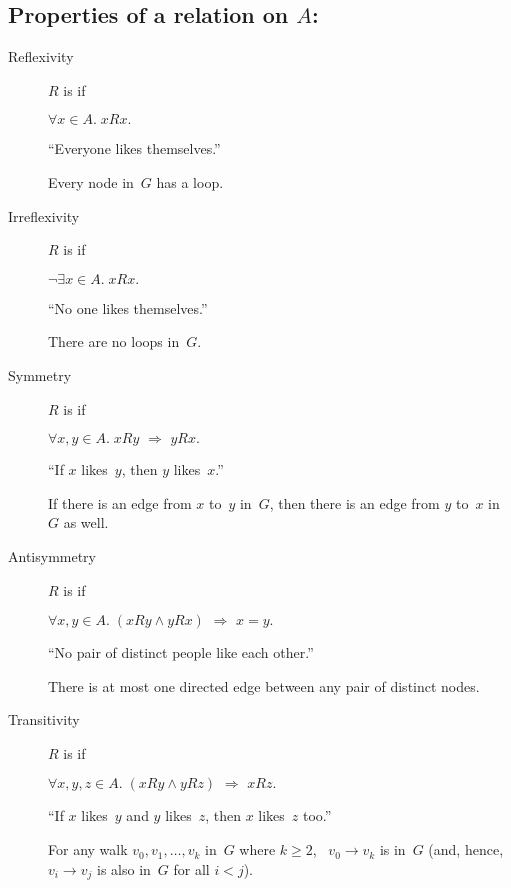 \documentclass[twoside,11pt]{article}
\newcommand{\QAND}{\wedge}
\newcommand{\QIMP}{\,\, \Rightarrow \,\,}
\newcommand{\QIMPLIES}{\,\, \Rightarrow \,\,}
\newcommand{\diredge}[2]{#1 \to #2}
\begin{document}

\subsection*{Properties of a relation on $A$:}
\begin{description}


\item[Reflexivity]

$R$ is  if

$\forall x \in A. \; x R x.$

``Everyone likes themselves.''

Every node in~$G$ has a loop.

\item[Irreflexivity]

$R$ is  if

$ \neg \exists x \in A. \; x R x.$

``No one likes themselves.''

There are no loops in~$G$.

\item[Symmetry]

$R$ is  if

$ \forall x, y \in A. \; x R y \QIMP y R x.$

``If $x$ likes~$y$, then $y$ likes~$x$.''

If there is an edge from $x$ to~$y$ in~$G$, then there is an edge from
$y$ to~$x$ in~$G$ as well.

\item[Antisymmetry]

$R$ is  if

$ \forall x, y \in A.\; (x R y \QAND y R x) \QIMPLIES x = y.$

``No pair of distinct people like each other.''

There is at most one directed edge between any pair of distinct nodes.

\item[Transitivity]

$R$ is  if

$ \forall x, y, z \in A. \; (x R y \QAND y R z) \QIMPLIES x R z.$

``If $x$ likes~$y$ and $y$ likes~$z$, then $x$ likes~$z$ too.''

For any walk $v_0, v_1, \dots, v_k$ in~$G$ where $k \ge 2$,
\ $\diredge{v_0}{v_k}$ is in~$G$ (and, hence, $\diredge{v_i}{v_j}$ is
also in~$G$ for all $i < j$).

\end{description}
\end{document}

